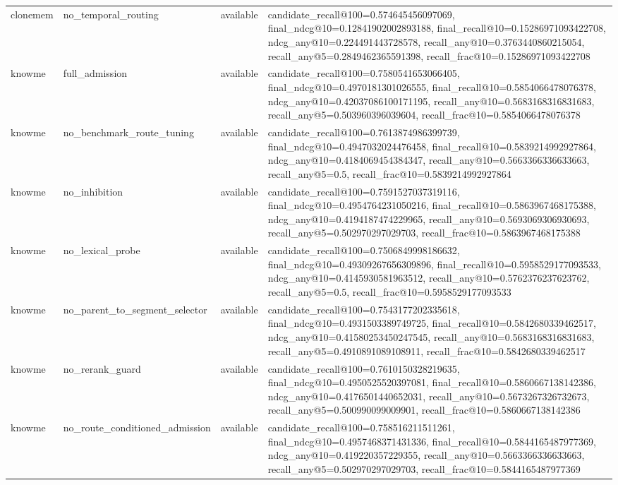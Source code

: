 \begin{tabular}{llll}
clonemem & no_temporal_routing & available & candidate_recall@100=0.574645456097069, final_ndcg@10=0.12841902002893188, final_recall@10=0.15286971093422708, ndcg_any@10=0.224491443728578, recall_any@10=0.3763440860215054, recall_any@5=0.2849462365591398, recall_frac@10=0.15286971093422708 \\
knowme & full_admission & available & candidate_recall@100=0.7580541653066405, final_ndcg@10=0.4970181301026555, final_recall@10=0.5854066478076378, ndcg_any@10=0.42037086100171195, recall_any@10=0.5683168316831683, recall_any@5=0.503960396039604, recall_frac@10=0.5854066478076378 \\
knowme & no_benchmark_route_tuning & available & candidate_recall@100=0.7613874986399739, final_ndcg@10=0.4947032024476458, final_recall@10=0.5839214992927864, ndcg_any@10=0.4184069454384347, recall_any@10=0.5663366336633663, recall_any@5=0.5, recall_frac@10=0.5839214992927864 \\
knowme & no_inhibition & available & candidate_recall@100=0.7591527037319116, final_ndcg@10=0.4954764231050216, final_recall@10=0.5863967468175388, ndcg_any@10=0.4194187474229965, recall_any@10=0.5693069306930693, recall_any@5=0.502970297029703, recall_frac@10=0.5863967468175388 \\
knowme & no_lexical_probe & available & candidate_recall@100=0.7506849998186632, final_ndcg@10=0.49309267656309896, final_recall@10=0.5958529177093533, ndcg_any@10=0.4145930581963512, recall_any@10=0.5762376237623762, recall_any@5=0.5, recall_frac@10=0.5958529177093533 \\
knowme & no_parent_to_segment_selector & available & candidate_recall@100=0.7543177202335618, final_ndcg@10=0.4931503389749725, final_recall@10=0.5842680339462517, ndcg_any@10=0.41580253450247545, recall_any@10=0.5683168316831683, recall_any@5=0.4910891089108911, recall_frac@10=0.5842680339462517 \\
knowme & no_rerank_guard & available & candidate_recall@100=0.7610150328219635, final_ndcg@10=0.4950525520397081, final_recall@10=0.5860667138142386, ndcg_any@10=0.4176501440652031, recall_any@10=0.5673267326732673, recall_any@5=0.500990099009901, recall_frac@10=0.5860667138142386 \\
knowme & no_route_conditioned_admission & available & candidate_recall@100=0.758516211511261, final_ndcg@10=0.4957468371431336, final_recall@10=0.5844165487977369, ndcg_any@10=0.419220357229355, recall_any@10=0.5663366336633663, recall_any@5=0.502970297029703, recall_frac@10=0.5844165487977369 \\

\end{tabular}
